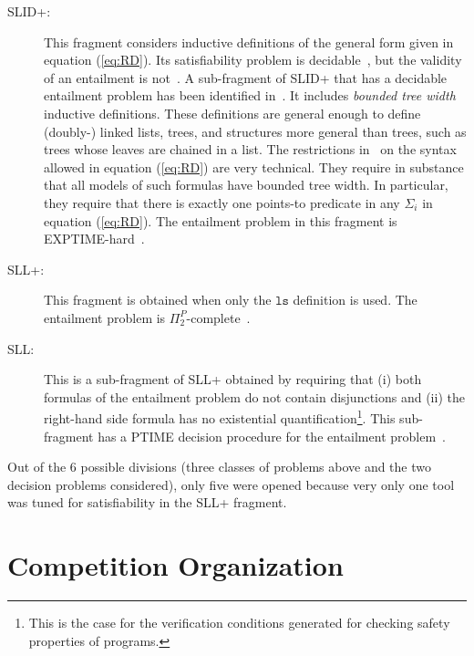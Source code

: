 \documentclass[twoside,11pt]{article}
\newcommand{\ls}{\mathtt{ls}}
\newcommand{\SLRD}{\textsc{SLID}}
\newcommand{\SLL}{\textsc{SLL}}
\begin{document}
\begin{description}
\item[\SLRD+:]
This fragment considers inductive definitions of the general form given in equation (\ref{eq:RD}).
Its satisfiability problem is decidable~\cite{BrotherstonFGNP13},
but the validity of an entailment is not~\cite{AntonopoulosGHKO14}.
%
A sub-fragment of \SLRD+ that has a decidable entailment problem has been identified in~\cite{IosifRS13}. It includes \emph{bounded tree width} inductive definitions.
These definitions are general enough to define (doubly-) linked lists, trees,
and structures more general than trees, such as trees whose leaves are chained in
a list. 
The restrictions in~\cite{IosifRS13} on the syntax allowed in equation (\ref{eq:RD}) are very technical. They require in substance that all models of such formulas have bounded tree width. 
In particular, they require that there is exactly one points-to predicate in any $\Sigma_i$ in equation (\ref{eq:RD}).
The entailment problem in this fragment is EXPTIME-hard~\cite{AntonopoulosGHKO14}.

\item[\SLL+:]
This fragment is obtained when only the $\ls$ definition is used.
The entailment problem is $\Pi^P_2$-complete~\cite{AntonopoulosGHKO14}.

\item[\SLL:]
This is a sub-fragment of \SLL+ obtained by requiring that
(i) both formulas of the entailment problem do not contain disjunctions and 
(ii) the right-hand side formula has no existential quantification\footnote{This is the case for the verification conditions generated for checking safety properties of programs.}. 
This sub-fragment has a PTIME decision procedure for the entailment problem~\cite{CookHOPW11}.
\end{description}

Out of the 6 possible divisions (three classes of problems above and the two decision problems considered), 
only five were opened because very only one tool was tuned for satisfiability in the \SLL+ fragment.


\section{Competition Organization}
\end{document}
